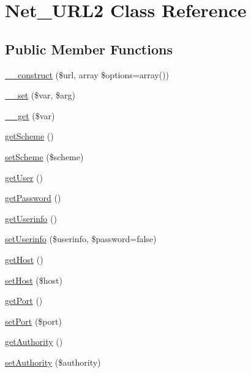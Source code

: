 \hypertarget{classNet__URL2}{}\section{Net\+\_\+\+U\+R\+L2 Class Reference}
\label{classNet__URL2}
\subsection*{Public Member Functions}
\begin{DoxyCompactItemize}
\item 
\hyperlink{classNet__URL2_a4c12ff0ddce6621148a4917b8040e567}{\+\_\+\+\_\+construct} (\$url, array \$options=array())
\item 
\hyperlink{classNet__URL2_ae2489e2f59be30883c898bc46ffbf9a1}{\+\_\+\+\_\+set} (\$var, \$arg)
\item 
\hyperlink{classNet__URL2_a6f7109a2d04198fafac837cae9d5c3ff}{\+\_\+\+\_\+get} (\$var)
\item 
\hyperlink{classNet__URL2_a9ebbd0b1bc71024ce48593cb1faeff41}{get\+Scheme} ()
\item 
\hyperlink{classNet__URL2_aadd3865f996d98703ec9bbdecfda4ba1}{set\+Scheme} (\$scheme)
\item 
\hyperlink{classNet__URL2_ad06292db039e4723ce457f416fc61763}{get\+User} ()
\item 
\hyperlink{classNet__URL2_a8cfbc773d2c8bb6727da1526770c4b9a}{get\+Password} ()
\item 
\hyperlink{classNet__URL2_a9249aba1b6b07ac8f992033cc865a455}{get\+Userinfo} ()
\item 
\hyperlink{classNet__URL2_a0e71d3ae85320e8e3ee181b49a11721b}{set\+Userinfo} (\$userinfo, \$password=false)
\item 
\hyperlink{classNet__URL2_a55343faf36c62fb1942229c00c53e42c}{get\+Host} ()
\item 
\hyperlink{classNet__URL2_afacc7bf64786203c167c2d771f1fddf9}{set\+Host} (\$host)
\item 
\hyperlink{classNet__URL2_a3684482beddce2747c3ef0cb5c3e9c64}{get\+Port} ()
\item 
\hyperlink{classNet__URL2_a4086e17a9dc2744b451ed0e5cc6fe113}{set\+Port} (\$port)
\item 
\hyperlink{classNet__URL2_af736dde13f102618a706c1cb47868b38}{get\+Authority} ()
\item 
\hyperlink{classNet__URL2_a9da06e86831f84fa7fba91e81e051160}{set\+Authority} (\$authority)
\item 

\end{DoxyCompactItemize}
